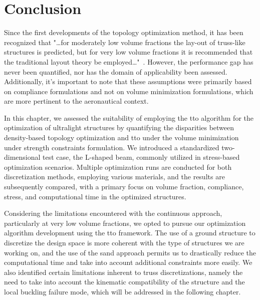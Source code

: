 \section{Conclusion}
Since the first developments of the topology optimization method, it has been recognized that "…for moderately low volume fractions the lay-out of truss-like structures is predicted, but for very low volume fractions it is recommended that the traditional layout theory be employed…"~. However, the performance gap has never been quantified, nor has the domain of applicability been assessed. Additionally, it's important to note that these assumptions were primarily based on compliance formulations and not on volume minimization formulations, which are more pertinent to the aeronautical context.

In this chapter, we assessed the suitability of employing the \gls{tto} algorithm for the optimization of ultralight structures by quantifying the disparities between density-based topology optimization and \gls{tto} under the volume minimization under strength constraints formulation. We introduced a standardized two-dimensional test case, the L-shaped beam, commonly utilized in stress-based optimization scenarios. Multiple optimization runs are conducted for both discretization methods, employing various materials, and the results are subsequently compared, with a primary focus on volume fraction, compliance, stress, and computational time in the optimized structures.

Considering the limitations encountered with the continuous approach, particularly at very low volume fractions, we opted to pursue our optimization algorithm development using the \acrfull{tto} framework. The use of a ground structure to discretize the design space is more coherent with the type of structures we are working on, and the use of the \gls{sand} approach permits us to drastically reduce the computational time and take into account additional constraints more easily. We also identified certain limitations inherent to truss discretizations, namely the need to take into account the kinematic compatibility of the structure and the local buckling failure mode, which will be addressed in the following chapter.